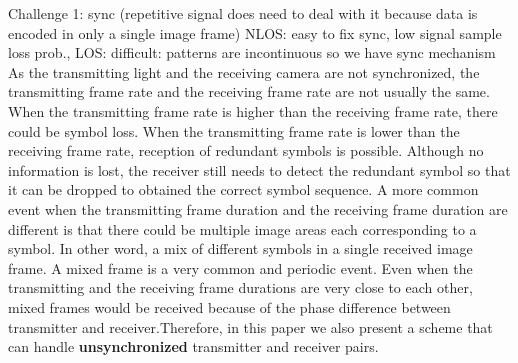 Challenge 1:
sync (repetitive signal does need to deal with it because data is encoded in only a single image frame)
NLOS: easy to fix sync, low signal sample loss prob., LOS: difficult: patterns are incontinuous
so we have sync mechanism 
As the transmitting light and the receiving camera are not synchronized, the transmitting frame rate and the receiving frame rate are not usually the same.
When the transmitting frame rate is higher than the receiving frame rate, there could be symbol loss.
When the transmitting frame rate is lower than the receiving frame rate, reception of redundant symbols is possible. 
Although no information is lost, the receiver still needs to detect the redundant symbol so that it can be dropped to obtained the correct symbol sequence.
A more common event when the transmitting frame duration and the receiving frame duration are different is that there could be multiple image areas each corresponding to a symbol. In other word, a mix of different symbols in a single received image frame. 
A mixed frame is a very common and periodic event.
Even when the transmitting and the receiving frame durations are very close to each other, mixed frames would be received because of the phase difference between transmitter and receiver.Therefore, in this paper we also present a scheme that can handle \textbf{unsynchronized} transmitter and receiver pairs. 

